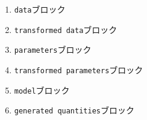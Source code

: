 \begin{enumerate}
	\item \texttt{data}ブロック
	\item \texttt{transformed data}ブロック
	\item \texttt{parameters}ブロック
	\item \texttt{transformed parameters}ブロック
	\item \texttt{model}ブロック
	\item \texttt{generated quantities}ブロック
\end{enumerate}
